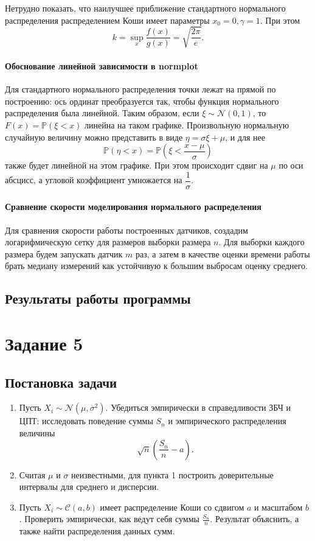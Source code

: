 \documentclass[16pt]{article}
\begin{document}
Нетрудно показать, что наилучшее приближение стандартного нормального распределения распределением Коши имеет параметры $x_0 = 0, \gamma = 1$. При этом
$$k = \sup_x \frac{f(x)}{g(x)} = \sqrt{\dfrac{2\pi}{e}}.$$

\paragraph{Обоснование линейной зависимости в normplot}
Для стандартного нормального распределения точки лежат на прямой по построению: ось ординат преобразуется так, чтобы функция нормального распределения была линейной. Таким образом, если $\xi \sim \mathcal{N}(0, 1)$, то $F(x) = \mathbb{P}(\xi < x)$ линейна на таком графике. Произвольную нормальную случайную величину можно представить в виде $\eta = \sigma \xi + \mu$, и для нее
$$\mathbb{P}(\eta < x) = \mathbb{P}\left(\xi < \frac{x - \mu}{\sigma}\right)$$
также будет линейной на этом графике. При этом происходит сдвиг на $\mu$ по оси абсцисс, а угловой коэффициент умножается на $\dfrac{1}{\sigma}$.

\paragraph{Сравнение скорости моделирования нормального распределения} Для сравнения скорости работы построенных датчиков, создадим логарифмическую сетку для размеров выборки размера $n$. Для выборки каждого размера будем запускать датчик $m$ раз, а затем в качестве оценки времени работы брать медиану измерений как устойчивую к большим выбросам оценку среднего.
\subsection{Результаты работы программы}

\section{Задание 5}
\subsection{Постановка задачи}
\begin{enumerate}
\item Пусть $X_i \sim \mathcal{N}(\mu, \sigma^2)$. Убедиться эмпирически в справедливости ЗБЧ и ЦПТ: исследовать поведение суммы $S_n$ и эмпирического распределения величины
$$\sqrt{n}\left(\frac{S_n}{n} - a\right).$$
\item Считая $\mu$ и $\sigma$ неизвестными, для пункта 1 построить доверительные интервалы для среднего и дисперсии.
\item Пусть $X_i \sim \mathcal{C}(a, b)$ имеет распределение Коши со сдвигом $a$ и масштабом $b$. Проверить эмпирически, как ведут себя суммы $\frac{S_n}{n}$. Результат объяснить, а также найти распределения данных сумм.
\end{enumerate}
\end{document}
